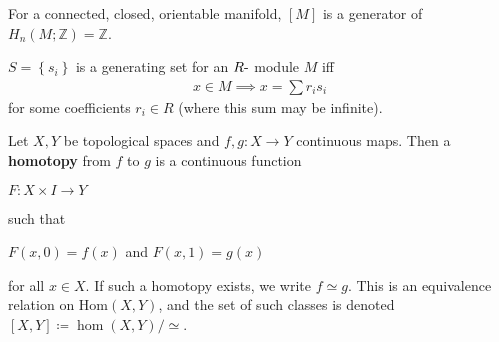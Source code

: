 
\begin{definition}

For a connected, closed, orientable manifold, \([M]\) is a generator of
\(H_{n}(M; {\mathbb{Z}}) = {\mathbb{Z}}\).

\end{definition}

\begin{definition}

\end{definition}


\begin{definition}

\(S = \left\{{s_{i}}\right\}\) is a generating set for an
\(R{\hbox{-}}\) module \(M\) iff
\begin{align*}x\in M \implies x = \sum r_{i} s_{i}\end{align*}
for some coefficients \(r_{i} \in R\) (where this sum may be infinite).

\end{definition}

\begin{definition}

\end{definition}


\begin{definition}

\end{definition}


\begin{definition}[Homologous]

\end{definition}


\begin{definition}[Homotopic]

\end{definition}


\begin{definition}[Homotopy]

Let \(X, Y\) be topological spaces and \(f,g: X \to Y\) continuous maps.
Then a \textbf{homotopy} from \(f\) to \(g\) is a continuous function

\(F: X \times I \to Y\)

such that

\(F(x, 0) = f(x)\) and \(F(x,1) = g(x)\)

for all \(x\in X\). If such a homotopy exists, we write \(f\simeq g\).
This is an equivalence relation on \(\text{Hom}(X,Y)\), and the set of
such classes is denoted \([X,Y] \coloneqq\hom (X,Y)/\simeq\).

\end{definition}


